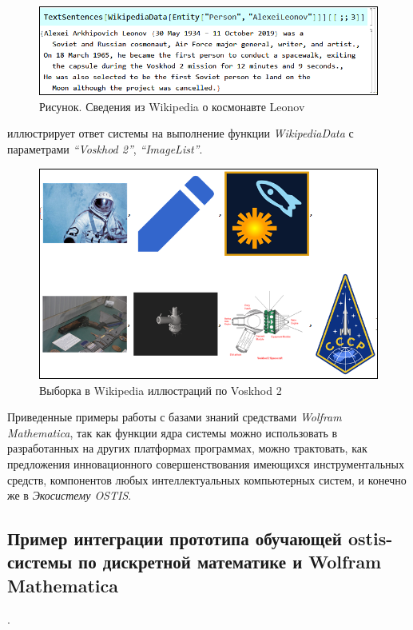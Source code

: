 \begin{figure}[H]
	\includegraphics[scale=0.55]{images/part7/chapter_integration/integr_alg6.png}
	\caption{Рисунок. Сведения из Wikipedia о космонавте Leonov}
	\label{fig:integr_alg6}
\end{figure}

\textit{} иллюстрирует ответ системы на выполнение функции \textit{WikipediaData} с параметрами \textit{``Voskhod 2''}, \textit{``ImageList''}.

\begin{figure}[H]
	\includegraphics[scale=0.56]{images/part7/chapter_integration/integr_alg7.png}
	\caption{Выборка в Wikipedia иллюстраций по Voskhod 2}
	\label{fig:integr_alg7}
\end{figure}

Приведенные примеры работы с базами знаний средствами \textit{Wolfram Mathematica}, так как функции ядра системы можно использовать в разработанных на других платформах программах, можно трактовать, как предложения инновационного совершенствования имеющихся инструментальных средств, компонентов любых интеллектуальных компьютерных систем, и конечно же в \textit{Экосистему OSTIS}.

\subsection{Пример интеграции прототипа обучающей ostis-системы по дискретной математике и Wolfram Mathematica}.
\label{subsec_cas_intergation}

